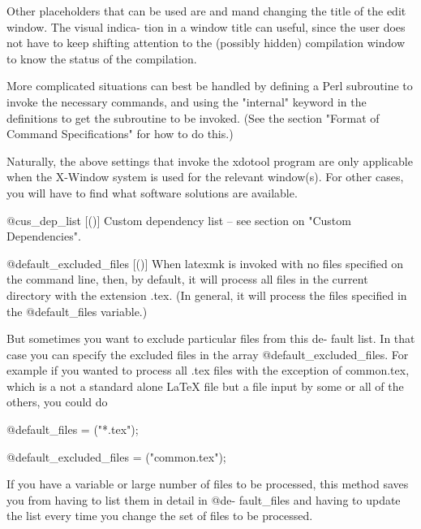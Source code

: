               Other placeholders that can be used are %
              and  %
              mand changing the title of the edit window. The  visual  indica-
              tion  in a window title can useful, since the user does not have
              to keep shifting attention to the (possibly hidden)  compilation
              window to know the status of the compilation.

              More  complicated  situations  can best be handled by defining a
              Perl subroutine to invoke the necessary commands, and using  the
              "internal"  keyword  in the definitions to get the subroutine to
              be invoked.  (See the section "Format of Command Specifications"
              for how to do this.)

              Naturally,  the  above  settings that invoke the xdotool program
              are only applicable when the X-Window system  is  used  for  the
              relevant window(s).  For other cases, you will have to find what
              software solutions are available.


       @cus_dep_list [()]
              Custom dependency list -- see section on "Custom Dependencies".

       @default_excluded_files [()]
              When latexmk is invoked with no files specified on  the  command
              line, then, by default, it will process all files in the current
              directory with the extension .tex.  (In general, it will process
              the files specified in the @default_files variable.)

              But sometimes you want to exclude particular files from this de-
              fault list.  In that case you can specify the excluded files  in
              the array @default_excluded_files.  For example if you wanted to
              process all .tex files with the exception of  common.tex,  which
              is a not a standard alone LaTeX file but a file input by some or
              all of the others, you could do

                   @default_files = ("*.tex");

                   @default_excluded_files = ("common.tex");

              If you have a variable or large number of files to be processed,
              this method saves you from having to list them in detail in @de-
              fault_files and having to update the list every time you  change
              the set of files to be processed.

